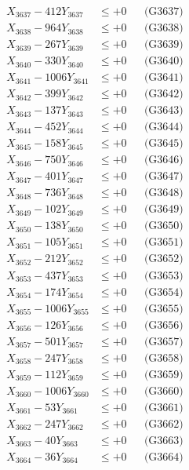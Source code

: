 \documentclass[a4paper,10pt]{article}
\begin{document}
{\begin{align}
X_{3637} - 412Y_{3637} &\leq +0 && \text{(G3637)} \\
X_{3638} - 964Y_{3638} &\leq +0 && \text{(G3638)} \\
X_{3639} - 267Y_{3639} &\leq +0 && \text{(G3639)} \\
X_{3640} - 330Y_{3640} &\leq +0 && \text{(G3640)} \\
\allowbreak
X_{3641} - 1006Y_{3641} &\leq +0 && \text{(G3641)} \\
X_{3642} - 399Y_{3642} &\leq +0 && \text{(G3642)} \\
X_{3643} - 137Y_{3643} &\leq +0 && \text{(G3643)} \\
X_{3644} - 452Y_{3644} &\leq +0 && \text{(G3644)} \\
X_{3645} - 158Y_{3645} &\leq +0 && \text{(G3645)} \\
X_{3646} - 750Y_{3646} &\leq +0 && \text{(G3646)} \\
X_{3647} - 401Y_{3647} &\leq +0 && \text{(G3647)} \\
X_{3648} - 736Y_{3648} &\leq +0 && \text{(G3648)} \\
X_{3649} - 102Y_{3649} &\leq +0 && \text{(G3649)} \\
X_{3650} - 138Y_{3650} &\leq +0 && \text{(G3650)} \\
\allowbreak
X_{3651} - 105Y_{3651} &\leq +0 && \text{(G3651)} \\
X_{3652} - 212Y_{3652} &\leq +0 && \text{(G3652)} \\
X_{3653} - 437Y_{3653} &\leq +0 && \text{(G3653)} \\
X_{3654} - 174Y_{3654} &\leq +0 && \text{(G3654)} \\
X_{3655} - 1006Y_{3655} &\leq +0 && \text{(G3655)} \\
X_{3656} - 126Y_{3656} &\leq +0 && \text{(G3656)} \\
X_{3657} - 501Y_{3657} &\leq +0 && \text{(G3657)} \\
X_{3658} - 247Y_{3658} &\leq +0 && \text{(G3658)} \\
X_{3659} - 112Y_{3659} &\leq +0 && \text{(G3659)} \\
X_{3660} - 1006Y_{3660} &\leq +0 && \text{(G3660)} \\
\allowbreak
X_{3661} - 53Y_{3661} &\leq +0 && \text{(G3661)} \\
X_{3662} - 247Y_{3662} &\leq +0 && \text{(G3662)} \\
X_{3663} - 40Y_{3663} &\leq +0 && \text{(G3663)} \\
X_{3664} - 36Y_{3664} &\leq +0 && \text{(G3664)} \\

\end{align}}
\end{document}
